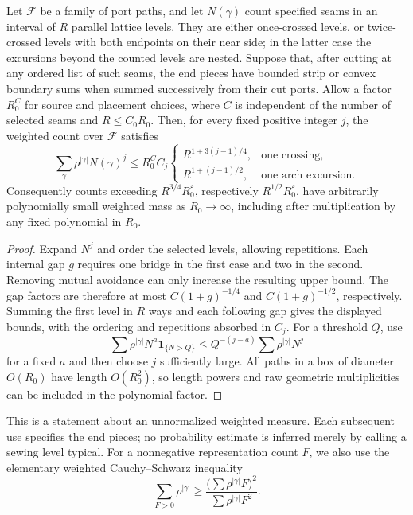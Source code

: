 \begin{lemma}
\label{lem:08-seam-moments}
Let $\mathcal F$ be a family of port paths, and let $N(\gamma)$ count
specified seams in an interval of $R$ parallel lattice levels. They are
either once-crossed levels, or twice-crossed levels with both endpoints
on their near side; in the latter case the excursions beyond the counted
levels are nested. Suppose that, after cutting at any ordered list of
such seams, the end pieces have bounded strip or convex boundary sums
when summed successively from their cut ports. Allow a factor $R_0^C$
for source and placement choices, where $C$ is independent of the number
of selected seams and $R\le C_0R_0$.
Then, for every fixed positive integer $j$, the weighted count over
$\mathcal F$ satisfies
\[
 \sum_\gamma\rho^{|\gamma|}N(\gamma)^j
 \le R_0^C C_j
 \begin{cases}
 R^{1+3(j-1)/4},&\text{one crossing},\\
 R^{1+(j-1)/2},&\text{one arch excursion}.
 \end{cases}
\]
Consequently counts exceeding \(R^{3/4}R_0^\varepsilon\), respectively
\(R^{1/2}R_0^\varepsilon\), have arbitrarily polynomially small weighted
mass as \(R_0\to\infty\), including after multiplication by any fixed
polynomial in \(R_0\).
\end{lemma}
\begin{proof}
Expand \(N^j\) and order the selected levels, allowing repetitions. Each
internal gap \(g\) requires one bridge in the first case and two in the
second. Removing mutual avoidance can only increase the resulting upper
bound. The gap factors are therefore at most
\(C(1+g)^{-1/4}\) and \(C(1+g)^{-1/2}\), respectively. Summing the
first level in \(R\) ways and each following gap gives the displayed
bounds, with the ordering and repetitions absorbed in \(C_j\).
For a threshold \(Q\), use
\[
 \sum\rho^{|\gamma|}N^a\mathbf1_{\{N>Q\}}
 \le Q^{-(j-a)}\sum\rho^{|\gamma|}N^j
\]
for a fixed \(a\) and then choose \(j\) sufficiently large. All paths in
a box of diameter \(O(R_0)\) have length \(O(R_0^2)\), so length powers
and raw geometric multiplicities can be included in the polynomial factor.
\end{proof}

This is a statement about an unnormalized weighted measure. Each subsequent
use specifies the end pieces; no probability estimate is inferred merely
by calling a sewing level typical. For a nonnegative representation count
\(F\), we also use the elementary weighted Cauchy--Schwarz inequality
\[
 \sum_{F>0}\rho^{|\gamma|}
 \ge\frac{\bigl(\sum\rho^{|\gamma|}F\bigr)^2}
           {\sum\rho^{|\gamma|}F^2}.
\]

